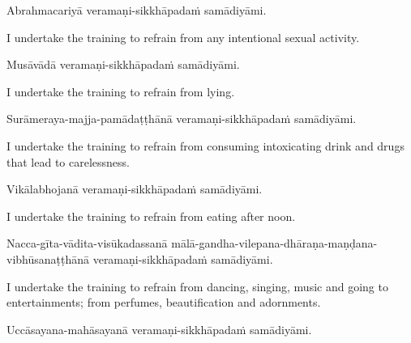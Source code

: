 Abrahmacariyā veramaṇi-sikkhāpadaṁ samādiyāmi.

\begin{english-hang}
  I undertake the training to refrain from any intentional sexual activity.
\end{english-hang}

Musāvādā veramaṇi-sikkhāpadaṁ samādiyāmi.

\begin{english}
  I undertake the training to refrain from lying.
\end{english}

\begin{pali-hang}
  Surāmeraya-majja-pamādaṭṭhānā veramaṇi-sikkhāpadaṁ samādiyāmi.
\end{pali-hang}

\begin{english-hang}
  I undertake the training to refrain from consuming intoxicating drink and drugs that\hyperlink{endnote138-appendix}{\hypertarget{endnote138-body}{}}
  lead to carelessness.
\end{english-hang}

Vikālabhojanā veramaṇi-sikkhāpadaṁ samādiyāmi.

\begin{english}
  I undertake the training to refrain from eating after noon.\hyperlink{endnote139-appendix}{\hypertarget{endnote139-body}{}}
\end{english}

\begin{pali-hang}
  Nacca-gīta-vādita-visūkadassanā mālā-gandha-vilepana-dhāraṇa-maṇḍana-vibhūsanaṭṭhānā veramaṇi-sikkhāpadaṁ samādiyāmi.
\end{pali-hang}

\begin{english-hang}
  I undertake the training to refrain from dancing, singing, music and going to entertainments; from perfumes, beautification and adornments.\hyperlink{endnote140-appendix}{\hypertarget{endnote140-body}{}}
\end{english-hang}

Uccāsayana-mahāsayanā veramaṇi-sikkhāpadaṁ samādiyāmi.

